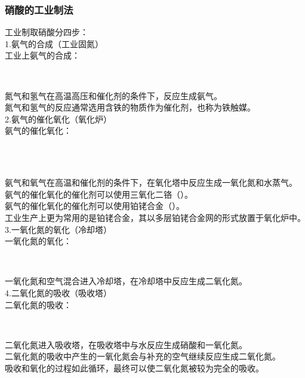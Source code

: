 \documentclass[UTF8]{ctexart}
\begin{document}
\newpage

\subsubsection{硝酸的工业制法}
    工业制取硝酸分四步：\\[4mm]
    1.氨气的合成（工业固氮）\\[3mm]
    工业上氨气的合成：
    \begin{center}
        \\[5mm]
    \end{center}
    氮气和氢气在高温高压和催化剂的条件下，反应生成氨气。\\[3mm]
    氮气和氢气的反应通常选用含铁的物质作为催化剂，也称为铁触媒。\\[6mm]
    2.氨气的催化氧化（氧化炉）\\[3mm]
    氨气的催化氧化：
    \begin{center}
        \\[3mm]
        \\[5mm]
    \end{center}
    氨气和氧气在高温和催化剂的条件下，在氧化塔中反应生成一氧化氮和水蒸气。\\[3mm]
    氨气的催化氧化的催化剂可以使用三氧化二铬（）。\\[3mm]
    氨气的催化氧化的催化剂可以使用铂铑合金（）。\\[3mm]
    工业生产上更为常用的是铂铑合金，其以多层铂铑合金网的形式放置于氧化炉中。\\[6mm]
    3.一氧化氮的氧化（冷却塔）\\[2mm]
    一氧化氮的氧化：
    \begin{center}
        \\[5mm]
    \end{center}
    一氧化氮和空气混合进入冷却塔，在冷却塔中反应生成二氧化氮。\\[6mm]
    4.二氧化氮的吸收（吸收塔）\\[3mm]
    二氧化氮的吸收：
    \begin{center}
        \\[5mm]
    \end{center}
    二氧化氮进入吸收塔，在吸收塔中与水反应生成硝酸和一氧化氮。\\[3mm]
    二氧化氮的吸收中产生的一氧化氮会与补充的空气继续反应生成二氧化氮。\\[3mm]
    吸收和氧化的过程如此循环，最终可以使二氧化氮被较为完全的吸收。
\end{document}
